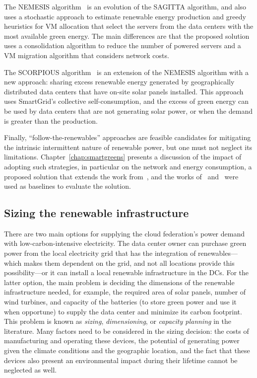 The NEMESIS algorithm~\citep{NEMESIS} is an evolution of the SAGITTA algorithm, and also uses a stochastic approach to estimate renewable energy production and greedy heuristics for VM allocation that select the servers from the data centers with the most available green energy. The main differences are that the proposed solution uses a consolidation algorithm to reduce the number of powered servers and a VM migration algorithm that considers network costs. 

The SCORPIOUS algorithm~\citep{SCORPIOUS} is an extension of the NEMESIS algorithm with a new approach: sharing excess renewable energy generated by geographically distributed data centers that have on-site solar panels installed. This approach uses SmartGrid's collective self-consumption, and the excess of green energy can be used by data centers that are not generating solar power, or when the demand is greater than the production.


Finally, ``follow-the-renewables'' approaches are feasible candidates for mitigating the intrinsic intermittent nature of renewable power, but one must not neglect its limitations. Chapter~\ref{chap:smartgreens} presents a discussion of the impact of adopting such strategies, in particular on the network and energy consumption, a proposed solution that extends the work from~\citet{NEMESIS}, and the works of~\citet{XU2020191} and~\citet{ALI2021110907} were used as baselines to evaluate the solution.


\subsection{Sizing the renewable infrastructure}


\label{sec:sizing}


There are two main options for supplying the cloud federation's power demand with low-carbon-intensive electricity. The data center owner can purchase green power from the local electricity grid that has the integration of renewables---which makes them dependent on the grid, and not all locations provide this possibility---or it can install a local renewable infrastructure in the DCs. For the latter option, the main problem is deciding the dimensions of the renewable infrastructure needed, for example, the required area of solar panels, number of wind turbines, and capacity of the batteries  (to store green power and use it when opportune) to supply the data center and minimize its carbon footprint. This problem is known as \emph{sizing}, \emph{dimensioning}, or \emph{capacity planning} in the literature. Many factors need to be considered in the sizing decision: the costs of manufacturing and operating these devices, the potential of generating power given the climate conditions and the geographic location, and the fact that these devices also present an environmental impact during their lifetime cannot be neglected as well.

